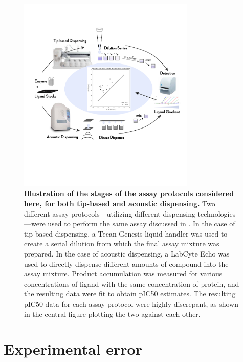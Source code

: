 \documentclass[aps,pre,twocolumn,nofootinbib,superscriptaddress,linenumbers]{revtex4-1}
\begin{document}
\begin{figure}[tb]
   \includegraphics[trim={0 15cm 0 8cm},clip,width=0.75\textwidth]{../figures/Fig1-4.pdf}
  \caption{{\bf Illustration of the stages of the assay protocols considered here, for both tip-based and acoustic dispensing.}
  Two different assay protocols---utilizing different dispensing technologies---were used to perform the same assay discussed in \citep{ekins_dispensing_2013}.
  In the case of tip-based dispensing, a Tecan Genesis liquid handler was used to create a serial dilution from which the final assay mixture was prepared. 
  In the case of acoustic dispensing, a LabCyte Echo was used to directly dispense different amounts of compound into the assay mixture.
  Product accumulation was measured for various concentrations of ligand with the same concentration of protein, and the resulting data were fit to obtain pIC50 estimates.
  The resulting pIC50 data for each assay protocol were highly discrepant, as shown in the central figure plotting the two against each other.
   }
  \label{fig:overview}
\end{figure}


\section{Experimental error}
\end{document}
